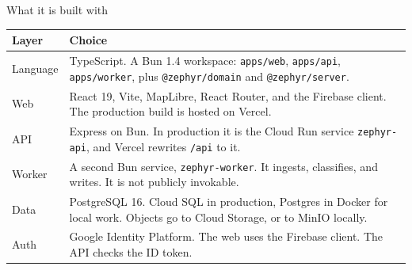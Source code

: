 \documentclass[t,aspectratio=169]{beamer}
\begin{document}
\begin{frame}[c]{What it is built with}
  \footnotesize
  \renewcommand{\arraystretch}{1.12}
  \begin{tabularx}{\textwidth}{@{}H Y@{}}
    \toprule
    \textcolor{nlNavy}{\textbf{Layer}} & \textbf{Choice} \\
    \midrule
    Language & TypeScript. A Bun 1.4 workspace: \texttt{apps/web}, \texttt{apps/api}, \texttt{apps/worker}, plus \texttt{@zephyr/domain} and \texttt{@zephyr/server}. \\
    Web & React 19, Vite, MapLibre, React Router, and the Firebase client. The production build is hosted on Vercel. \\
    API & Express on Bun. In production it is the Cloud Run service \texttt{zephyr-api}, and Vercel rewrites \texttt{/api} to it. \\
    Worker & A second Bun service, \texttt{zephyr-worker}. It ingests, classifies, and writes. It is not publicly invokable. \\
    Data & PostgreSQL 16. Cloud SQL in production, Postgres in Docker for local work. Objects go to Cloud Storage, or to MinIO locally. \\
    Auth & Google Identity Platform. The web uses the Firebase client. The API checks the ID token. \\
    \bottomrule
  \end{tabularx}
\end{frame}
\end{document}
